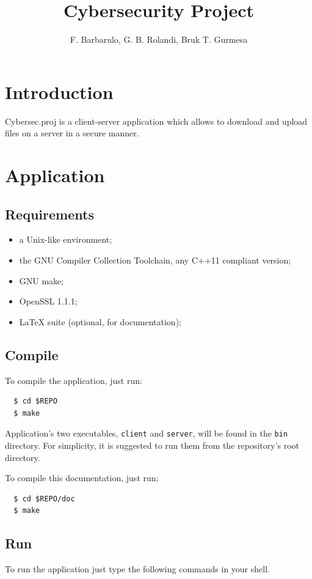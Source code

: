 \documentclass[a4paper,12pt]{article}
\title{Cybersecurity Project}
\author{F. Barbarulo, G. B. Rolandi, Bruk T. Gurmesa}
\newcommand{\projectname}{Cybersec.proj}
\begin{document}
\maketitle
\tableofcontents

\clearpage

\section{Introduction}
\projectname{} is a client-server application which allows to download and upload files on a server in a secure manner.

\section{Application}
\subsection{Requirements}
\begin{itemize}
  \item a Unix-like environment;
  \item the GNU Compiler Collection Toolchain, any C++11 compliant version;
  \item GNU make;
  \item OpenSSL 1.1.1;
  \item LaTeX suite (optional, for documentation);
\end{itemize}

\subsection{Compile}
To compile the application, just run:
\begin{verbatim}
  $ cd $REPO
  $ make
\end{verbatim}

Application's two executables, \texttt{client} and \texttt{server}, will be found in the \texttt{bin} directory.
For simplicity, it is suggested to run them from the repository's root directory.

To compile this documentation, just run:
\begin{verbatim}
  $ cd $REPO/doc
  $ make
\end{verbatim}

\subsection{Run}
To run the application just type the following commands in your shell.
\end{document}
